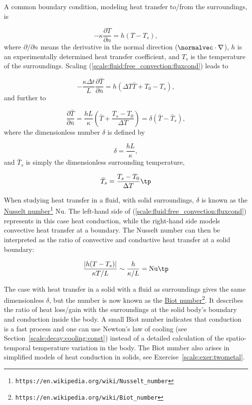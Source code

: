 \documentclass[graybox,envcountchap,sectrefs,final]{svmonodo}
\begin{document}
A common boundary condition, modeling heat transfer to/from the
surroundings, is

\begin{equation}
-\kappa\frac{\partial T}{\partial n} = h(T - T_s),
\label{scale:fluid:free_convection:fluxcond}
\end{equation}
where $\partial/\partial n$ means the derivative in the normal direction
($\normalvec\cdot\nabla$), $h$ is an experimentally determined
heat transfer coefficient, and $T_s$ is the temperature of
the surroundings. Scaling (\ref{scale:fluid:free_convection:fluxcond})
leads to

\[ -\frac{\kappa\Delta t}{L}\frac{\partial \bar T}{\partial \bar n} = h(\Delta T \bar T + T_0 - T_s),\]
and further to

\[ \frac{\partial \bar T}{\partial \bar n} =
\frac{hL}{\kappa}(\bar T + \frac{T_s - T_0}{\Delta T})
= \delta(\bar T - \bar T_s),
\]
where the dimensionless number $\delta$ is defined by

\[ \delta = \frac{hL}{\kappa},\]
and $\bar T_s$ is simply the dimensionless surrounding temperature,

\[ \bar T_s = \frac{T_s - T_0}{\Delta T}\tp\]

When studying heat transfer in a fluid, with solid surroundings,
$\delta$ is known as the \href{{https://en.wikipedia.org/wiki/Nusselt_number}}{Nusselt number}\footnote{\texttt{https://en.wikipedia.org/wiki/Nusselt\_number}} Nu.  The left-hand side
of (\ref{scale:fluid:free_convection:fluxcond}) represents in this case
heat conduction, while the right-hand side models convective heat
transfer at a boundary. The Nusselt number can then be interpreted as
the ratio of convective and conductive heat transfer at a solid
boundary:

\[ \frac{|h(T-T_s)|}{\kappa T/L} \sim \frac{h}{\kappa /L} = \hbox{Nu}\tp\]

The case with heat transfer in a solid with a fluid as surroundings
gives the same dimensionless $\delta$, but the number is now known as
the \href{{https://en.wikipedia.org/wiki/Biot_number}}{Biot number}\footnote{\texttt{https://en.wikipedia.org/wiki/Biot\_number}}. It
describes the ratio of heat loss/gain with the surroundings at the
solid body's boundary and conduction inside the body. A small Biot
number indicates that conduction is a fast process and one can use
Newton's law of cooling (see Section~\ref{scale:decay:cooling:const})
instead of a detailed calculation of the
spatio-temporal temperature variation in the body. The Biot number
also arises in simplified models of heat conduction in solids,
see Exercise~\ref{scale:exer:twometal}.
\end{document}
